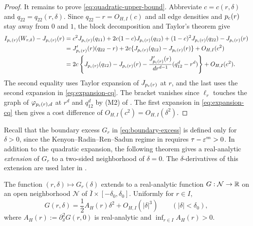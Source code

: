 \begin{proof}
It remains to prove \eqref{eq:quadratic-upper-bound}.
Abbreviate $c=c(r,\delta)$ and $q_{22}=q_{22}(r,\delta)$.  Since $q_{22}-r=O_{H,I}(c)$ and
all edge densities and $p_{\mathrm c}(r)$ stay away from $0$ and $1$, the block decomposition and Taylor's theorem give
\begin{align*}
  I_{p_{\mathrm c}(r)}(W_{r,\delta})-J_{p_{\mathrm c}(r)}(r)
  &=c^2J_{p_{\mathrm c}(r)}(q_{11})+2c(1-c)J_{p_{\mathrm c}(r)}(q_{12})
    +(1-c)^2J_{p_{\mathrm c}(r)}(q_{22})-J_{p_{\mathrm c}(r)}(r)\\
  &=J_{p_{\mathrm c}(r)}'(r)(q_{22}-r)
    +2c\{J_{p_{\mathrm c}(r)}(q_{12})-J_{p_{\mathrm c}(r)}(r)\}+O_{H,I}(c^2)\\
  &=2c\left\{J_{p_{\mathrm c}(r)}(q_{12})-J_{p_{\mathrm c}(r)}(r)
    -\frac{J_{p_{\mathrm c}(r)}'(r)}{d r^{d-1}}(q_{12}^d-r^d)\right\}
    +O_{H,I}(c^2).
\end{align*}
The second equality uses Taylor expansion of $J_{p_{\mathrm c}(r)}$ at $r$, and the last
uses the second expansion in \eqref{eq:expansion-cq}.
The bracket vanishes since $\ell_r$ touches the graph of $\varphi_{p_{\mathrm c}(r),d}$ at $r^d$ and
$q_{12}^d$ by (M2) of .
The first expansion in \eqref{eq:expansion-cq} then gives a cost difference
of $O_{H,I}(c^2)=O_{H,I}(\delta^2)$.
\end{proof}

Recall that the boundary excess $G_r$ in \eqref{eq:boundary-excess} is defined
only for $\delta>0$, since the Kenyon--Radin--Ren--Sadun regime in
 requires $\tau-\varepsilon^m>0$.
In addition to the quadratic expansion, the following theorem gives a
real-analytic \emph{extension} of $G_r$ to a two-sided neighborhood of
$\delta=0$.  The $\delta$-derivatives of this extension are
used later in .

\begin{theorem}\label{thm:boundary-excess-expansion}
The function $(r,\delta)\mapsto G_r(\delta)$ extends to a real-analytic
function $G:\mathcal N\to\mathbb R$ on an open neighborhood $\mathcal N$ of
$\bar I\times[-\delta_0,\delta_0]$.  Uniformly for $r\in I$,
\begin{equation}\label{eq:boundary-excess-expansion}
  G(r,\delta)=\frac12A_H(r)\delta^2+O_{H,I}(|\delta|^3)
  \qquad(|\delta|<\delta_0),
\end{equation}
where $A_H(r):=\partial_\delta^2G(r,0)$ is real-analytic and
$\inf_{r\in I}A_H(r)>0$.
\end{theorem}

